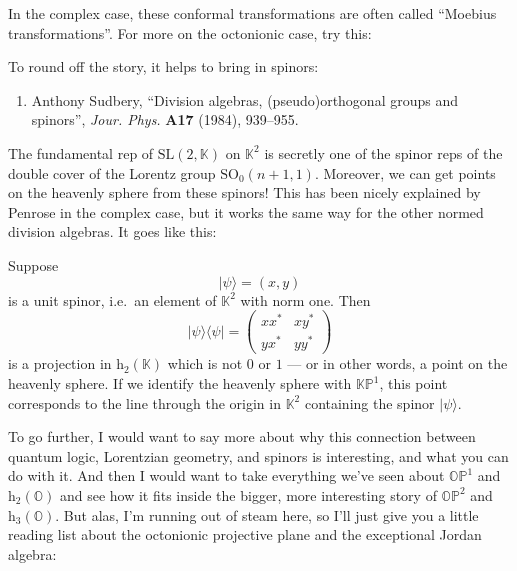 \documentclass{article}
\def\tightlist{}
\renewcommand{\texttt}[1]{%
  \begingroup
  \ttfamily
  \begingroup\lccode`~=`/\lowercase{\endgroup\def~}{/\discretionary{}{}{}}%
  \begingroup\lccode`~=`[\lowercase{\endgroup\def~}{[\discretionary{}{}{}}%
  \begingroup\lccode`~=`.\lowercase{\endgroup\def~}{.\discretionary{}{}{}}%
  \catcode`/=\active\catcode`[=\active\catcode`.=\active
  \scantokens{#1\noexpand}%
  \endgroup
}
\begin{document}
In the complex case, these conformal transformations are often called
``Moebius transformations''. For more on the octonionic case, try this:


To round off the story, it helps to bring in spinors:

\begin{enumerate}
\def\labelenumi{\arabic{enumi})}
\setcounter{enumi}{15}
\tightlist
\item
  Anthony Sudbery, ``Division algebras, (pseudo)orthogonal groups and
  spinors'', \emph{Jour. Phys.} \textbf{A17} (1984), 939--955.
\end{enumerate}

The fundamental rep of \(\mathrm{SL}(2,\mathbb{K})\) on \(\mathbb{K}^2\)
is secretly one of the spinor reps of the double cover of the Lorentz
group \(\mathrm{SO}_0(n+1,1)\). Moreover, we can get points on the
heavenly sphere from these spinors! This has been nicely explained by
Penrose in the complex case, but it works the same way for the other
normed division algebras. It goes like this:

Suppose \[\vert\psi\rangle = (x,y)\] is a unit spinor, i.e.~an element
of \(\mathbb{K}^2\) with norm one. Then \[
  \vert\psi\rangle\langle\psi\vert =
  \left(
    \begin{array}{cc}
      xx^*&xy^*
    \\yx^*&yy^*
    \end{array}
  \right)
\] is a projection in \(\mathrm{h}_2(\mathbb{K})\) which is not \(0\) or
\(1\) --- or in other words, a point on the heavenly sphere. If we
identify the heavenly sphere with \(\mathbb{KP}^1\), this point
corresponds to the line through the origin in \(\mathbb{K}^2\)
containing the spinor \(\vert\psi\rangle\).

To go further, I would want to say more about why this connection
between quantum logic, Lorentzian geometry, and spinors is interesting,
and what you can do with it. And then I would want to take everything
we've seen about \(\mathbb{OP}^1\) and \(\mathrm{h}_2(\mathbb{O})\) and
see how it fits inside the bigger, more interesting story of
\(\mathbb{OP}^2\) and \(\mathrm{h}_3(\mathbb{O})\). But alas, I'm
running out of steam here, so I'll just give you a little reading list
about the octonionic projective plane and the exceptional Jordan
algebra:
\end{document}
